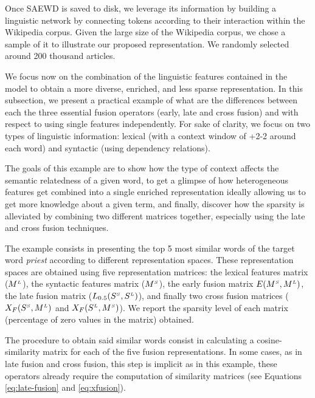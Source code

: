 Once SAEWD is saved to disk, we leverage its information by building a linguistic network by connecting tokens according to their interaction within the Wikipedia corpus. Given the large size of the Wikipedia corpus, we chose a sample of it to illustrate our proposed representation. We randomly selected around 200 thousand articles. %


%

We focus now on the combination of the linguistic features contained in the model to obtain a more diverse, enriched, and less sparse representation. In this subsection, we present a practical example of what are the differences between each the three essential fusion operators (early, late and cross fusion)  and with respect to using single features independently. For sake of clarity, we focus on two types of linguistic information: lexical (with a context window  of +2-2 around each word) and syntactic (using  dependency relations).

The goals of this example are to show how the type of context affects the semantic relatedness of a given word, to get a glimpse of how heterogeneous features get combined into a single enriched representation ideally allowing us to get more knowledge about a given term, and finally, discover how the sparsity is alleviated by combining two different matrices together, especially using the late and cross fusion techniques. 

The example consists in presenting the top 5 most similar words of the target word \textit{priest} according to different representation spaces. These representation spaces are obtained using five representation matrices: the lexical features matrix ($M^{\scriptscriptstyle L}$),  the syntactic features matrix ($M^{\scriptscriptstyle S}$), the early fusion matrix $E(M^{\scriptscriptstyle S},M^{\scriptscriptstyle L})$, the late fusion matrix ($L_{0.5}(S^{\scriptscriptstyle S},S^{\scriptscriptstyle L})$), and finally two cross fusion matrices ($X_F(S^{\scriptscriptstyle S},M^{\scriptscriptstyle L})$ and $X_F(S^{\scriptscriptstyle L},M^{\scriptscriptstyle S})$). We  report the sparsity level of each matrix (percentage of zero values in the matrix) obtained. 

The procedure to obtain said similar words consist in calculating a cosine-similarity matrix for each of the five fusion representations. In some cases, as in late fusion and cross fusion, this step is implicit as in this example, these operators already require the computation of similarity matrices (see Equations \ref{eq:late-fusion} and \ref{eq:xfusion}).

